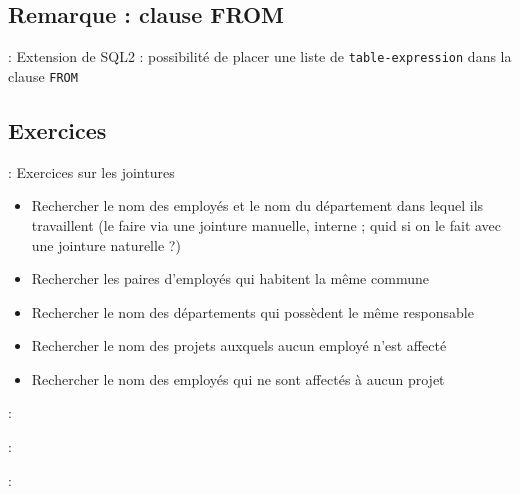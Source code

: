 \documentclass[10pt]{beamer}
\begin{document}
\subsection{Remarque : clause FROM}
\begin{frame}{\secname : \subsecname}
    Extension de SQL2 : possibilité de placer une liste de \lstinline[language=bnf]!table-expression! dans la clause \lstinline[language=plsql]!FROM!
    
\end{frame}


\subsection{Exercices}
\begin{frame}{\secname : \subsecname}
    Exercices sur les jointures
    \begin{itemize}
        \item Rechercher le nom des employés et le nom du département dans lequel ils travaillent (le faire via une jointure manuelle, interne ; quid si on le fait avec une jointure naturelle ?)
        \item Rechercher les paires d'employés qui habitent la même commune
        \item Rechercher le nom des départements qui possèdent le même responsable
        \item Rechercher le nom des projets auxquels aucun employé n'est affecté
        \item Rechercher le nom des employés qui ne sont affectés à aucun projet
    \end{itemize}
\end{frame}
\begin{frame}[allowframebreaks]{\secname : \subsecname}
    
\end{frame}

\begin{frame}{\secname : \subsecname}
    
\end{frame}
\begin{frame}{\secname : \subsecname}
    
\end{frame}
\end{document}
